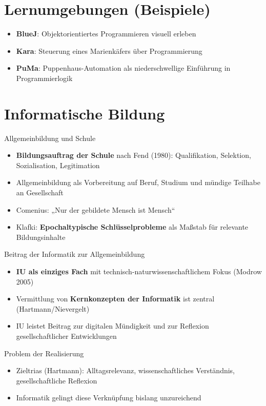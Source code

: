 \documentclass{article}
\begin{document}
\section{Lernumgebungen (Beispiele)}
\begin{itemize}
    \item \textbf{BlueJ}: Objektorientiertes Programmieren visuell erleben
    \item \textbf{Kara}: Steuerung eines Marienkäfers über Programmierung
    \item \textbf{PuMa}: Puppenhaus-Automation als niederschwellige Einführung in Programmierlogik
\end{itemize}

\section{Informatische Bildung}
\begin{block}{Allgemeinbildung und Schule}
    \begin{itemize}
        \item \textbf{Bildungsauftrag der Schule} nach Fend (1980): Qualifikation, Selektion, Sozialisation, Legitimation
        \item Allgemeinbildung als Vorbereitung auf Beruf, Studium und mündige Teilhabe an Gesellschaft
        \item Comenius: „Nur der gebildete Mensch ist Mensch“
        \item Klafki: \textbf{Epochaltypische Schlüsselprobleme} als Maßstab für relevante Bildungsinhalte
    \end{itemize}
\end{block}

\begin{block}{Beitrag der Informatik zur Allgemeinbildung}
    \begin{itemize}
        \item \textbf{IU als einziges Fach} mit technisch-naturwissenschaftlichem Fokus (Modrow 2005)
        \item Vermittlung von \textbf{Kernkonzepten der Informatik} ist zentral (Hartmann/Nievergelt)
        \item IU leistet Beitrag zur digitalen Mündigkeit und zur Reflexion gesellschaftlicher Entwicklungen
    \end{itemize}
\end{block}

\begin{block}{Problem der Realisierung}
    \begin{itemize}
        \item Zieltrias (Hartmann): Alltagsrelevanz, wissenschaftliches Verständnis, gesellschaftliche Reflexion
        \item Informatik gelingt diese Verknüpfung bislang unzureichend
    \end{itemize}
\end{block}
\end{document}

